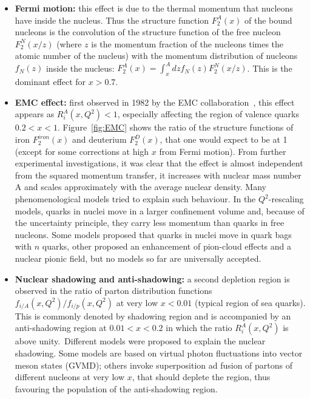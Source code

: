 \begin{itemize}
\item {\bf Fermi motion:} this effect is due to the 
thermal momentum that nucleons have inside the nucleus. 
Thus the structure function $F^A_2(x)$ of the bound nucleons
is the convolution of the structure function of the free nucleon 
$F^N_2(x/z)$ (where $z$ is the momentum fraction
of the nucleons times the atomic number of the nucleus) 
with the momentum distribution
of nucleons $f_N(z)$ inside the nucleus: 
$F^A_2(x) = \int_x^A dz f_N(z) F_2^N(x/z)$.
This is the dominant effect for $x > 0.7$.
\item {\bf EMC effect:} first observed in 1982 by the EMC collaboration~\cite{Aubert:1983xm},
this effect appears as $R_i^A(x,Q^2)<1$, especially affecting the region 
of valence quarks $0.2 < x < 1$. Figure~\ref{fig:EMC} shows the ratio of the structure functions 
of iron $F^{iron}_2(x)$ and deuterium $F^D_2(x)$, that one would expect to be at 1 (except for 
some corrections at high $x$ from Fermi motion). From further
experimental investigations, it was clear that the effect is almost independent from the 
squared momentum transfer, it increases with nuclear mass 
number A and scales approximately with the average nuclear density. 
Many phenomenological models tried to explain such behaviour. 
In the $Q^2$-rescaling models, 
quarks in nuclei move in a larger confinement volume and, 
because of the uncertainty principle, 
they carry less momentum than quarks in free nucleons. 
Some models proposed that 
quarks in nuclei move in quark bags with $n$ quarks, 
other proposed an enhancement 
of pion-cloud effects and a nuclear pionic field, 
but no models so far are universally accepted. 

\item {\bf Nuclear shadowing and anti-shadowing:} a second depletion region
is observed in the ratio of parton distribution functions $f_{i/A}(x,Q^2) / f_{i/p}(x,Q^2)$ 
at very low $x<0.01$ (typical region of sea quarks). This is commonly denoted 
by shadowing region and is accompanied by
an anti-shadowing region at $0.01 < x < 0.2$ in which the ratio $R_i^A(x,Q^2)$
is above unity.~Different models were
proposed to explain the nuclear shadowing. Some models are based on virtual 
photon fluctuations into vector meson states (GVMD); others
invoke superposition ad fusion of partons of different nucleons at very low $x$, that should deplete the 
region, thus favouring the population of the anti-shadowing region.

\end{itemize}


